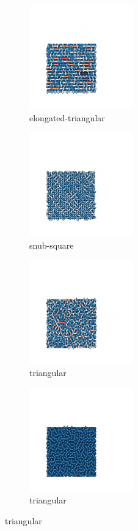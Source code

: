 \begin{figure}[bt]
     \centering
 
     \begin{subfigure}[b]{0.45\textwidth}
         \centering
         \includegraphics[height=4.5cm]{./figures/procrystals/pro_elong4.pdf}
         \caption{elongated\--triangular}
         \label{fig:pro45a}
     \end{subfigure}
     \begin{subfigure}[b]{0.45\textwidth}
         \centering
         \includegraphics[height=4.5cm]{./figures/procrystals/pro_snub4.pdf}
         \caption{snub\--square}
         \label{fig:pro45b}
     \end{subfigure}
     
	\vspace{2mm}          
     \begin{subfigure}[b]{0.45\textwidth}
         \centering
         \includegraphics[height=4.5cm]{./figures/procrystals/pro_tri4.pdf}
         \caption{triangular}
         \label{fig:pro45c}
     \end{subfigure}  
     \begin{subfigure}[b]{0.45\textwidth}
         \centering
         \includegraphics[height=4.5cm]{./figures/procrystals/pro_tri5.pdf}
         \caption{triangular}
         \label{fig:pro45d}
     \end{subfigure}
    

\end{figure}
